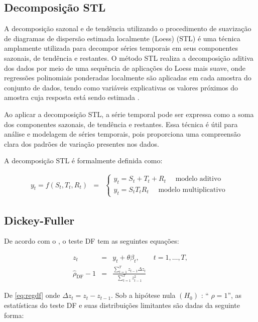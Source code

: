  
 \subsection{Decomposi\c c\~ao STL}
 
 A decomposição sazonal e de tendência utilizando o procedimento de suavização de diagramas de dispersão estimada localmente (Loess) (STL) é uma técnica amplamente utilizada para decompor séries temporais em seus componentes sazonais, de tendência e restantes. O método STL realiza a decomposição aditiva dos dados por meio de uma sequência de aplicações do Loess mais suave, onde regressões polinomiais ponderadas localmente são aplicadas em cada amostra do conjunto de dados, tendo como variáveis explicativas os valores próximos do amostra cuja resposta está sendo estimada \cite{Theodosiou20111178}.
 
 Ao aplicar a decomposição STL, a série temporal pode ser expressa como a soma dos componentes sazonais, de tendência e restantes. Essa técnica é útil para análise e modelagem de séries temporais, pois proporciona uma compreensão clara dos padrões de variação presentes nos dados.
 
 A decomposição STL é formalmente definida como:
 
 \begin{eqnarray}
 	y_t=f\left(S_t, T_t, R_t\right)&=&\left\{\begin{array}{l}
 		y_t=S_t+T_t+R_t \quad \text { modelo aditivo } \\
 		y_t=S_t T_t R_t \quad \text { modelo multiplicativo }
 	\end{array}\right. \label{eq:stl}
 \end{eqnarray}
 
 \subsection{Dickey-Fuller}
 
 De acordo com o , o teste DF tem as seguintes equações:
 
 \begin{eqnarray}
 	z_t&=& y_t+\theta \beta_t, \qquad t=1,\ldots, T, \label{eq:df3}\\	
 	\hat{\rho}_{\mathrm{DF}}-1&=&\frac{\sum_{t=1}^T z_{t-1} \Delta z_t}{\sum_{t=1}^T z_{t-1}^2} \label{eq:regdf}
 \end{eqnarray}
 
 De \eqref{eq:regdf} onde $\Delta z_t=z_t-z_{t-1}$. Sob a hipótese nula $\left(H_0\right)$ : `` $\rho=1$'', as estatísticas do teste DF e suas distribuições limitantes são dadas da seguinte forma:
 
